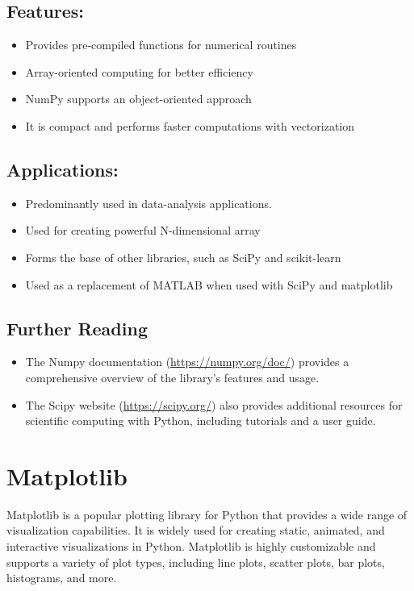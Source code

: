 \subsection{Features:}

\begin{itemize}
	\item Provides pre-compiled functions for numerical routines 
	\item Array-oriented computing for better efficiency
	\item NumPy supports an object-oriented approach
	\item It is compact and performs faster computations with vectorization
\end{itemize}

\subsection{Applications:}

\begin{itemize}
	\item Predominantly used in data-analysis applications.
	\item Used for creating powerful N-dimensional array
	\item Forms the base of other libraries, such as SciPy and scikit-learn
	\item Used as a replacement of MATLAB when used with SciPy and matplotlib
\end{itemize}

\subsection{Further Reading}

\begin{itemize}
	\item The Numpy documentation (\url{https://numpy.org/doc/}) provides a comprehensive overview of the library's features and usage.
	\item The Scipy website (\url{https://scipy.org/}) also provides additional resources for scientific computing with Python, including tutorials and a user guide.
\end{itemize}

\section{Matplotlib}

Matplotlib is a popular plotting library for Python that provides a wide range of visualization capabilities. It is widely used for creating static, animated, and interactive visualizations in Python. Matplotlib is highly customizable and supports a variety of plot types, including line plots, scatter plots, bar plots, histograms, and more.\cite{rougier:2021}

